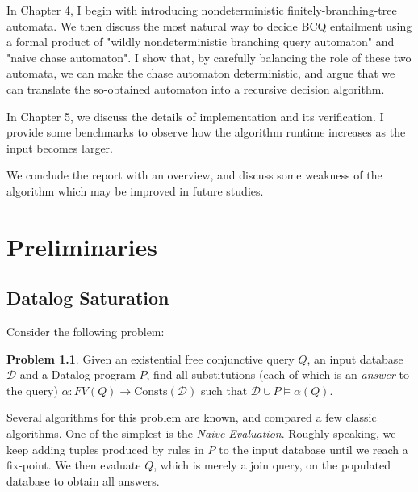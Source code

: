 \documentclass[12pt]{report}
\theoremstyle{plain}
\theoremstyle{definition}
\newtheorem{problem}[theorem]{Problem}
\def\Consts{{\mathrm{Consts}}}
\begin{document}
In Chapter 4, I begin with introducing nondeterministic finitely-branching-tree automata. We then discuss the most natural way to decide BCQ entailment using a formal product of "wildly nondeterministic branching query automaton" and "naive chase automaton". I show that, by carefully balancing the role of these two automata, we can make the chase automaton deterministic, and argue that we can translate the so-obtained automaton into a recursive decision algorithm.

In Chapter 5, we discuss the details of implementation and its verification. I provide some benchmarks to observe how the algorithm runtime increases as the input becomes larger.

We conclude the report with an overview, and discuss some weakness of the algorithm which may be improved in future studies.

\newpage
\chapter{Preliminaries}


\section{Datalog Saturation}

Consider the following problem:

\begin{problem}
   Given an existential free conjunctive query $Q$, an input database $\mathcal{D}$ and a Datalog program $P$, find all substitutions (each of which is an \emph{answer} to the query) $\alpha: FV(Q) \rightarrow \Consts(\mathcal{D})$ such that $\mathcal{D} \cup P \models \alpha(Q)$.
\end{problem}

Several algorithms for this problem are known, and \cite{bancilhon_ramakrishnan_1986} compared a few classic algorithms. One of the simplest is the \emph{Naive Evaluation}. Roughly speaking, we keep adding tuples produced by rules in $P$ to the input database until we reach a fix-point. We then evaluate $Q$, which is merely a join query, on the populated database to obtain all answers.
\end{document}
